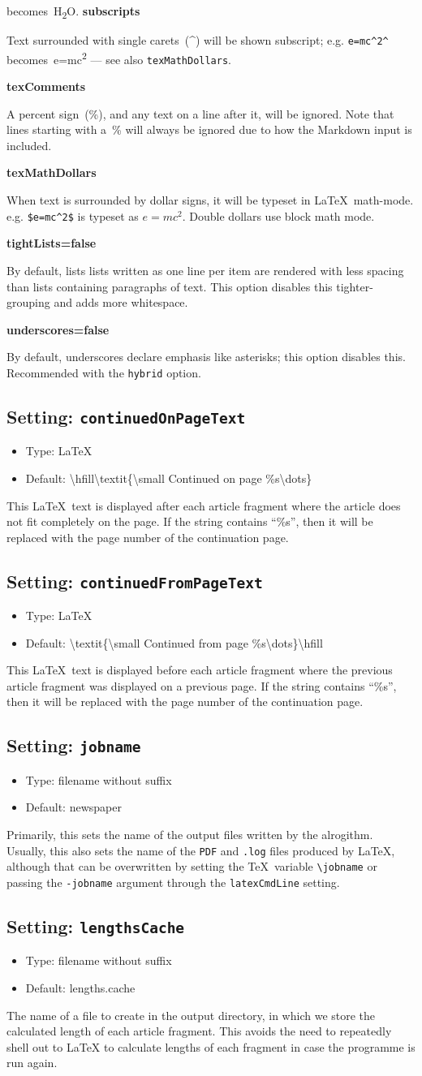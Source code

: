 \documentclass[a4paper,DIV=11]{scrartcl}
\newcommand{\deft}[2]{\nopagebreak\noindent\hspace{0.5in}\textbf{#1}\par\noindent{}#2\pagebreak[1]\par}
\newcommand{\property}[5]{
  \subsection{#1: \texttt{#2}}
  \begin{itemize}
  \item Type: #3
  \item Default: #4
  \end{itemize}
  #5
}
\newcommand{\setting}{\property{Setting}}
\begin{document}
\begin{multicols}{2}
{{      becomes~H\textsubscript{2}O.}
    \deft{subscripts}{Text surrounded with single carets~(\textasciicircum)
      will be shown subscript; e.g. \texttt{e=mc\textasciicircum2\textasciicircum}
      becomes~e=mc\textsuperscript{2} --- see also \texttt{texMathDollars}.}
    \deft{texComments}{A percent sign~(\%), and any text on a line
      after it, will be ignored. Note that lines starting with a~\%
      will always be ignored due to how the Markdown input is included.}
    \deft{texMathDollars}{When text is surrounded by dollar
      signs, it will be typeset in
      \LaTeX\ math-mode. e.g. \texttt{\$e=mc\textasciicircum2\$} is typeset as
      $e=mc^2$. Double dollars use block math mode.}
    \deft{tightLists=false}{By default, lists lists written as one
      line per item are rendered with less spacing than lists containing paragraphs of
      text. This option disables this tighter-grouping and adds more
      whitespace.}
    \deft{underscores=false}{By default, underscores declare emphasis
      like asterisks; this option disables this. Recommended with the
      \texttt{hybrid} option.}
}
\setting{continuedOnPageText}{\LaTeX}{\textbackslash hfill\textbackslash textit\{\textbackslash small Continued
    on page \%s\textbackslash dots\}}{
  This \LaTeX\ text is displayed after each article fragment where the
  article does not fit completely on the page. If the string contains
  ``\%s'', then it will be replaced with the page number of the
  continuation page.
}
\setting{continuedFromPageText}{\LaTeX}{\textbackslash textit\{\textbackslash small Continued
  from page \%s\textbackslash dots\}\textbackslash hfill}{
  This \LaTeX\ text is displayed before each article fragment where the
  previous article fragment was displayed on a previous page. If the
  string contains ``\%s'', then it will be replaced with the page
  number of the continuation page.
}
\setting{jobname}{filename without suffix}{newspaper}{Primarily, this
  sets the name of the output files written by the alrogithm. Usually,
  this also sets the name of the \texttt{PDF} and \texttt{.log} files
  produced by \LaTeX, although that can be overwritten by setting the
  \TeX\ variable \texttt{\textbackslash jobname} or passing the
  \texttt{-jobname} argument through the \texttt{latexCmdLine}
  setting.}
\setting{lengthsCache}{filename without suffix}{lengths.cache}{
  The name of a file to create in the output directory, in which we
  store the calculated length of each article fragment. This avoids
  the need to repeatedly shell out to LaTeX to calculate lengths of
  each fragment in case the programme is run again.\par
}
\end{multicols}
\end{document}

